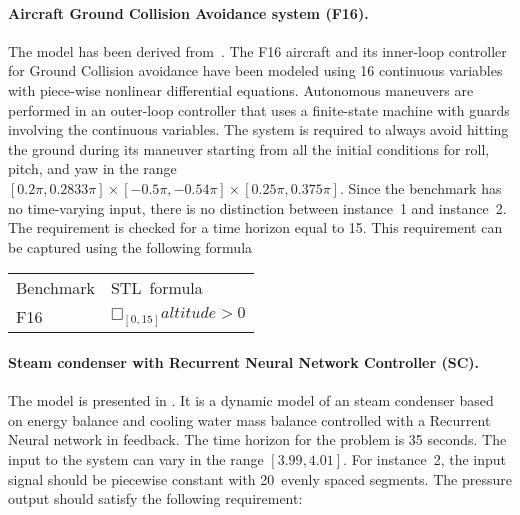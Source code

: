 \documentclass[a4paper]{easychair}
\newcommand{\falsify}{falsify\xspace}
\begin{document}


	\paragraph{Aircraft Ground Collision Avoidance system (F16).}
	The model has been derived
    from~\cite{ARCH18:Verification_Challenges_in_F_16}. The F16
    aircraft and its inner-loop controller for Ground Collision
    avoidance have been modeled using 16 continuous variables with
    piece-wise nonlinear differential equations. Autonomous maneuvers
    are performed in an outer-loop controller that uses a finite-state
    machine with guards involving the continuous variables. The system
    is required to always avoid hitting the ground during its maneuver
    starting from all the initial conditions for roll, pitch, and yaw
    in the range
    $[0.2\pi, 0.2833\pi]\times[ -0.5\pi, -0.54\pi]\times[0.25\pi,
    0.375\pi]$.  Since the benchmark has no time-varying input, there
    is no distinction between instance~1 and instance~2.  The
    requirement is checked for a time horizon equal to 15. This
    requirement can be captured using the following formula

	\begin{tabular}{ll}
		\toprule
		Benchmark & STL~formula \\
		\cmidrule(r){1-1} \cmidrule(l){2-2}
		F16  & $□_{[0, 15]} altitude >0$ \\
		\bottomrule
	\end{tabular}

	\paragraph{Steam condenser with Recurrent Neural Network Controller (SC).}

	The model is presented in \cite{YaghoubiHSCC}. It is a dynamic model of an steam condenser based on energy balance and cooling water mass balance controlled with a Recurrent Neural network in feedback. The time horizon for the problem is 35 seconds. The input to the system can vary in the range $[3.99, 4.01]$.
    For instance~2, the input signal should be piecewise constant with 20~evenly spaced segments.
    The pressure output should satisfy the following requirement:
\end{document}
